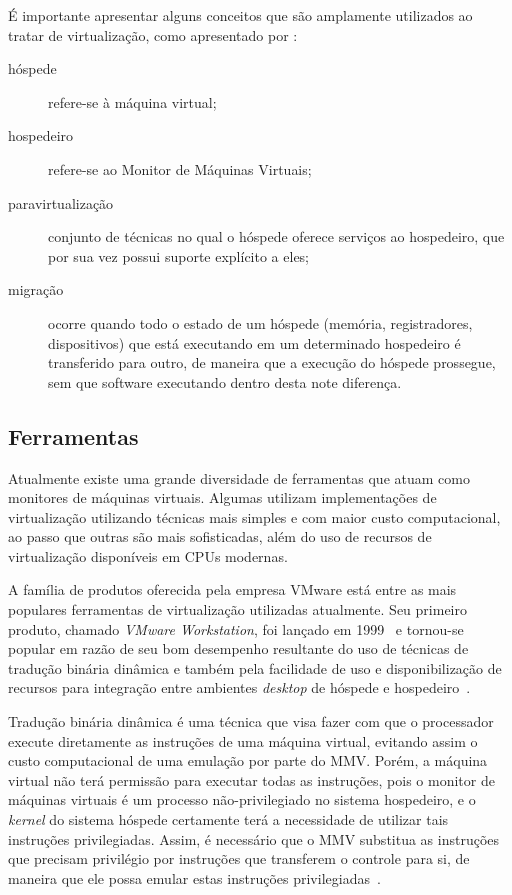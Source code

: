

É importante apresentar alguns conceitos que são amplamente utilizados ao
tratar de virtualização, como apresentado por
:
\begin{description}
  \item[hóspede] refere-se à máquina virtual;
  \item[hospedeiro] refere-se ao Monitor de Máquinas Virtuais;
  \item[paravirtualização] conjunto de técnicas no qual o hóspede oferece
        serviços ao hospedeiro, que por sua vez possui suporte explícito a
        eles;
  \item[migração] ocorre quando todo o estado de um hóspede
       (memória, registradores, dispositivos) que está executando em um
       determinado hospedeiro é transferido para outro, de maneira que a
       execução do hóspede prossegue, sem que software executando dentro
       desta note diferença.
\end{description}

\subsection{Ferramentas}

Atualmente existe uma grande diversidade de ferramentas que atuam como
monitores de máquinas virtuais. Algumas utilizam implementações de
virtualização utilizando técnicas mais simples e com maior custo
computacional, ao passo que outras são mais sofisticadas, além do uso de
recursos de virtualização disponíveis em CPUs modernas.

A família de produtos oferecida pela empresa VMware está entre as mais
populares ferramentas de virtualização utilizadas atualmente. Seu primeiro
produto, chamado \emph{VMware Workstation}, foi lançado em
1999~\cite{vmwareMilestones} e tornou-se popular em razão de seu bom
desempenho resultante do uso de técnicas de tradução binária dinâmica e também
pela facilidade de uso e disponibilização de recursos para integração entre
ambientes \emph{desktop} de hóspede e hospedeiro~\cite{nieh2000examining}.

Tradução binária dinâmica é uma técnica que visa fazer com que o processador
execute diretamente as instruções de uma máquina virtual, evitando assim o
custo computacional de uma emulação por parte do MMV. Porém, a máquina virtual
não terá permissão para executar todas as instruções, pois o monitor de
máquinas virtuais é um processo não-privilegiado no sistema hospedeiro, e o
\emph{kernel} do sistema hóspede certamente terá a necessidade de utilizar tais
instruções privilegiadas. Assim, é necessário que o MMV substitua as instruções
que precisam privilégio por instruções que transferem o controle para si, de
maneira que ele possa emular estas instruções
privilegiadas~\cite{ung2000machine}.

